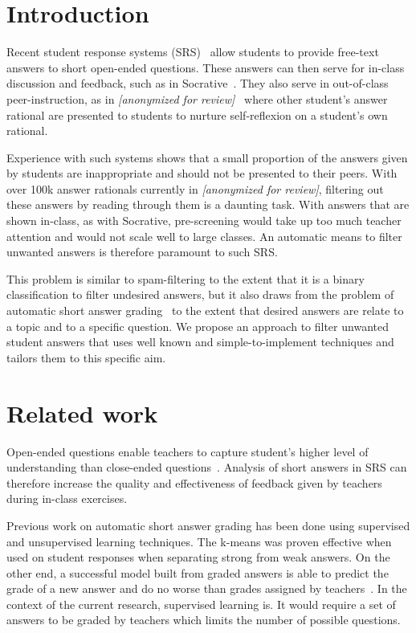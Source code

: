 \documentclass{edm_template}
\newcommand{\dalite}{\textit{[anonymized for review]}}
\begin{document}

\section{Introduction}

Recent student response systems (SRS)~\cite{kaleta2007student,farris2017using} allow students to provide free-text answers to short open-ended questions.  These answers can then serve for in-class discussion and feedback, such as in Socrative~\cite{nawalaniec2015socrative}.  They also serve in out-of-class peer-instruction, as in \dalite~\cite{bhatnagar2016dalite} where other student's answer rational are presented to students to nurture self-reflexion on a student's own rational.

Experience with such systems shows that a small proportion of the answers given by students are inappropriate and should not be presented to their peers.  With over 100k answer rationals currently in \dalite, filtering out these answers by reading through them is a daunting task.  With answers that are shown in-class, as with Socrative, pre-screening would take up too much teacher attention and would not scale well to large classes.  An automatic means to filter unwanted answers is therefore paramount to such SRS.

This problem is similar to spam-filtering to the extent that it is a binary classification to filter undesired answers, but it also draws from the problem of automatic short answer grading~\cite{galhardi2018machine} to the extent that desired answers are relate to a topic and to a specific question.  We propose an approach to filter unwanted student answers that uses well known and simple-to-implement techniques and tailors them to this specific aim.

\section{Related work}

Open-ended questions enable teachers to capture student's higher level of understanding than close-ended questions~\cite{reilly2014scoring}. Analysis of short answers in SRS can therefore increase the quality and effectiveness of feedback given by teachers during in-class exercises. 

Previous work on automatic short answer grading has been done using supervised and unsupervised learning techniques. The k-means was proven effective when used on student responses when separating strong from weak answers. On the other end, a successful model built from graded answers is able to predict the grade of a new answer and do no worse than grades assigned  by teachers~\cite{suzen2018automatic}. In the context of the current research, supervised learning is. It would require a set of answers to be graded by teachers which limits the number of possible questions.
\end{document}
